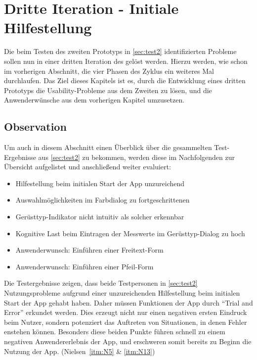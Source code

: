 \chapter{Dritte Iteration - Initiale Hilfestellung}\label{chap:pro3}
Die beim Testen des zweiten Prototyps in \autoref{sec:test2} identifizierten Probleme sollen nun in einer dritten Iteration des \hcdp{} gelöst werden.
Hierzu werden, wie schon im vorherigen Abschnitt, die vier Phasen des Zyklus ein weiteres Mal durchlaufen.
Das Ziel dieses Kapitels ist es, durch die Entwicklung eines dritten Prototyps die Usability-Probleme aus dem Zweiten zu lösen, und die Anwenderwünsche aus dem vorherigen Kapitel umzusetzen.

\section{Observation}\label{sec:obs3}
Um auch in diesem Abschnitt einen Überblick über die gesammelten Test-Ergebnisse aus \autoref{sec:test2} zu bekommen, werden diese im Nachfolgenden zur Übersicht aufgelistet und anschließend weiter evaluiert:

\begin{itemize}
	\item Hilfestellung beim initialen Start der App unzureichend
	\item Auswahlmöglichkeiten im Farbdialog zu fortgeschrittenen
	\item Gerüsttyp-Indikator nicht intuitiv als solcher erkennbar
	\item Kognitive Last beim Eintragen der Messwerte im Gerüsttyp-Dialog zu hoch
	\item Anwenderwunsch: Einführen einer Freitext-Form
	\item Anwenderwunsch: Einführen einer Pfeil-Form 
\end{itemize}

\noindent
Die Testergebnisse zeigen, dass beide Testpersonen in \autoref{sec:test2} Nutzungsprobleme aufgrund einer unzureichenden Hilfestellung beim initialen Start der App gehabt haben.
Daher müssen Funktionen der App durch ``Trial and Error'' erkundet werden.
Dies erzeugt nicht nur einen negativen ersten Eindruck beim Nutzer, sondern potenziert das Auftreten von Situationen, in denen Fehler enstehen können.
Besonders diese beiden Punkte führen schnell zu einem negativen Anwendererlebnis der App, und erschweren somit bereits zu Beginn die Nutzung der App.
(Nielsen~\autoref{itm:N5} \& \autoref{itm:N13}) \\

